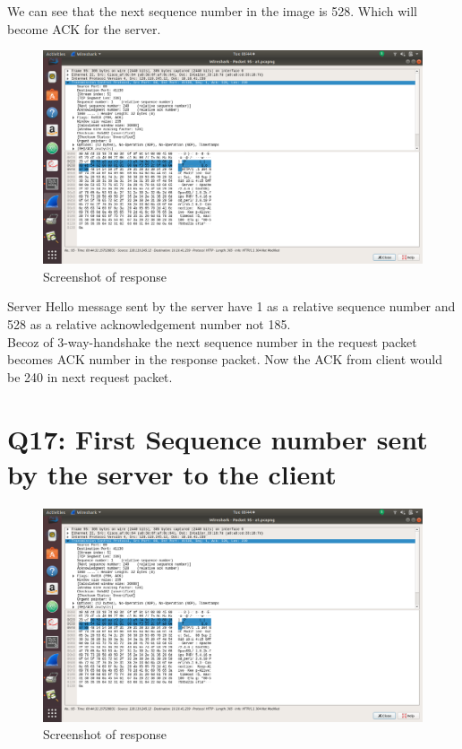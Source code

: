 \documentclass{article}
\begin{document}
 We can see that the next sequence number in the image is 528. Which will become ACK for the server.
 
 \begin{figure}[H]
 \centering
 \includegraphics[width=1.0\textwidth]{../q16/b.png}
 \caption{\label{fig:PING}Screenshot of response}
 \end{figure}
Server Hello message sent by the server have 1 as a relative sequence number
and 528 as a relative acknowledgement number not 185.\\

Becoz of 3-way-handshake the next sequence number in the request packet becomes ACK number in the response packet. Now the ACK from client would be 240 in next request packet.
 
\section{Q17: First Sequence number sent by the server to the client}
 \begin{figure}[H]
 \centering
 \includegraphics[width=1.0\textwidth]{../q16/b.png}
 \caption{\label{fig:PING}Screenshot of response}
 \end{figure}
 
\end{document}
